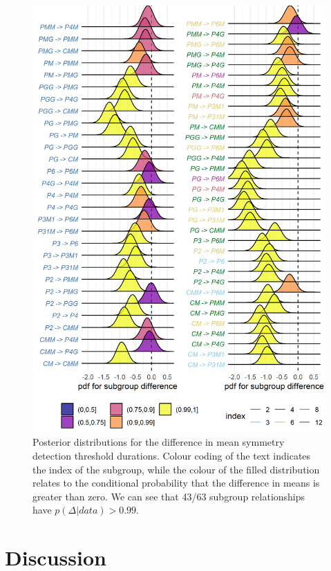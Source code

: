 \documentclass[9pt,twocolumn,twoside,lineno]{pnas-new}
\begin{document}
\begin{figure}[tbh]
\centering
\includegraphics[width=1\linewidth]{../analysis/plots/subgroup_comp_psychophysical.png}
\caption{Posterior distributions for the difference in mean symmetry detection threshold durations. Colour coding of the text indicates the index of the subgroup, while the colour of the filled distribution relates to the conditional probability that the difference in means is greater than zero. We can see that 43/63 subgroup relationships have $p(\Delta|data)>0.99$.}
\label{fig:durations_comp}
\end{figure}

\section*{Discussion}
\end{document}
